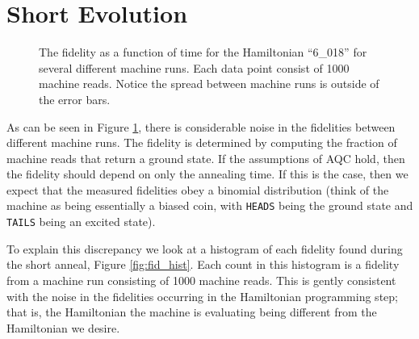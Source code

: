 \section{Short Evolution}
\begin{figure}
	\caption[Short Time Fidelities]{The fidelity as a function of time for the Hamiltonian ``6\_018'' for several different machine runs.  Each data point consist of 1000 machine reads.  Notice the spread between machine runs is outside of the error bars.}
	\label{fig:short_fidelity}
\end{figure}
As can be seen in Figure \ref{fig:short_fidelity}, there is considerable noise in the fidelities between different machine runs.  The fidelity is determined by computing the fraction of machine reads that return a ground state.  If the assumptions of AQC hold, then the fidelity should depend on only the annealing time.  If this is the case, then we expect that the measured fidelities obey a binomial distribution (think of the machine as being essentially a biased coin, with \texttt{HEADS} being the ground state and \texttt{TAILS} being an excited state).  

To explain this discrepancy we look at a histogram of each fidelity found during the short anneal, Figure \ref{fig:fid_hist}.  Each count in this histogram is a fidelity from a machine run consisting of 1000 machine reads.  This is gently consistent with the noise in the fidelities occurring in the Hamiltonian programming step; that is, the Hamiltonian the machine is evaluating being different from the Hamiltonian we desire.

